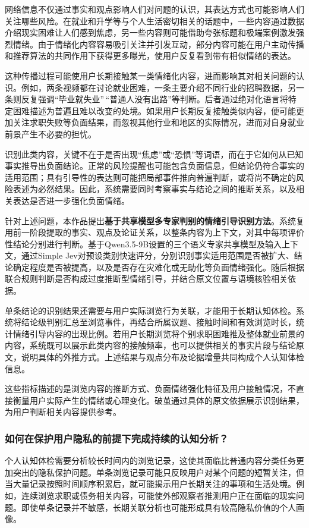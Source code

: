 网络信息不仅通过事实和观点影响人们对问题的认识，其表达方式也可能影响人们关注哪些风险。在就业和升学等与个人生活密切相关的话题中，一些内容通过数据介绍现实困难让人们感到焦虑，另一些内容则可能借助夸张标题和极端案例激发强烈情绪。由于情绪化内容容易吸引关注并引发互动，部分内容可能在用户主动传播和推荐算法的共同作用下获得更多曝光，使用户反复看到带有相似情绪的表达。

这种传播过程可能使用户长期接触某一类情绪化内容，进而影响其对相关问题的认识。例如，两条视频都在讨论就业困难，一条主要介绍不同行业的招聘数据，另一条则反复强调``毕业就失业''\,``普通人没有出路''等判断。后者通过绝对化语言将特定困难描述为普遍且难以改变的处境。如果用户长期反复接触类似内容，便可能更加关注求职失败等负面结果，而忽视其他行业和地区的实际情况，进而对自身就业前景产生不必要的担忧。

识别此类内容，关键不在于是否出现``焦虑''或``恐惧''等词语，而在于它如何从已知事实推导出负面结论。正常的风险提醒也可能包含负面信息，但结论仍符合事实的适用范围；具有引导性的表达则可能把局部事件推向普遍判断，或将尚不确定的风险表述为必然结果。因此，系统需要同时考察事实与结论之间的推断关系，以及相关表达是否进一步强化负面情绪。

针对上述问题，本作品提出\textbf{基于共享模型多专家判别的情绪引导识别方法}。系统复用前一阶段提取的事实、观点及论证关系，以整条内容为上下文，对其中每项评价性结论分别进行判断。基于Qwen3.5-9B设置的三个语义专家共享模型及输入上下文，通过Simple Jev对预设类别快速评分，分别识别事实适用范围是否被扩大、结论确定程度是否被提高，以及是否存在灾难化或无助化等负面情绪强化。随后根据联合规则判断是否构成过度推断型情绪引导，并结合原文位置与语境核验相关依据。

单条结论的识别结果还需要与用户实际浏览行为关联，才能用于长期认知体检。系统将结论级判别汇总至浏览事件，再结合所属议题、接触时间和有效浏览时长，统计情绪引导内容的出现比例。若用户长期浏览将个别求职困难推及整体就业前景的内容，系统既可以展示此类内容的接触频率，也可以提供相关的事实片段与结论原文，说明具体的外推方式。上述结果与观点分布及论据增量共同构成个人认知体检信息。

这些指标描述的是浏览内容的推断方式、负面情绪强化特征及用户接触情况，不直接衡量用户实际产生的情绪或心理变化。破茧通过具体的原文依据展示识别结果，为用户判断相关内容提供参考。

\subsubsection{如何在保护用户隐私的前提下完成持续的认知分析？}\label{section:1.2.3}

个人认知体检需要分析较长时间内的浏览记录，这使其面临比普通内容分类任务更加突出的隐私保护问题。单条浏览记录可能只反映用户对某个问题的短暂关注，但当大量记录按照时间顺序积累后，就可能揭示用户长期关注的事项和生活处境。例如，连续浏览求职或债务相关内容，可能使外部观察者推测用户正在面临的现实问题。即使单条记录并不敏感，长期关联分析也可能形成具有较高隐私价值的个人画像。

